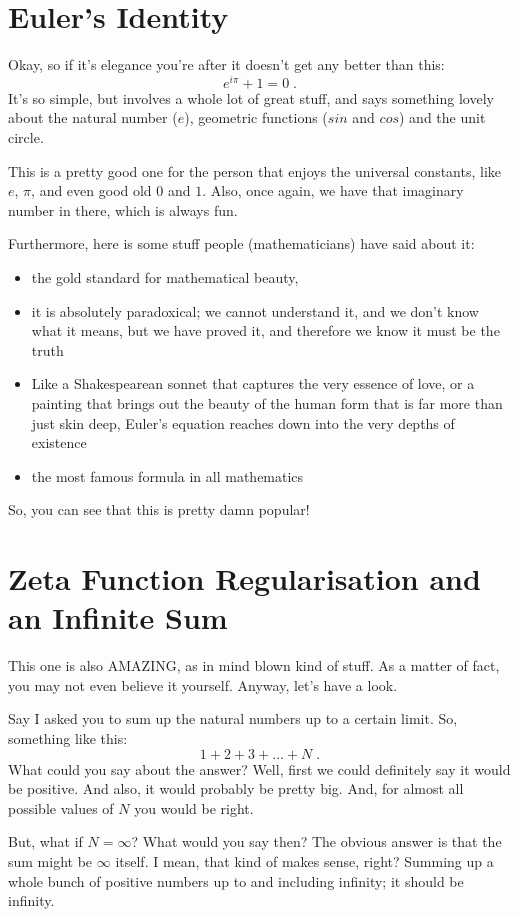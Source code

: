 \documentclass[12pt]{scrartcl}
\begin{document}
\section{Euler's Identity}

Okay, so if it's elegance you're after it doesn't get any better than this:
\[ e^{i\pi} + 1 = 0 \; . \]
It's so simple, but involves a whole lot of great stuff, and says something
lovely about the natural number ($e$), geometric functions ($sin$ and $cos$)
and the unit circle.

This is a pretty good one for the person that enjoys the universal constants,
like $e$, $\pi$, and even good old $0$ and $1$. Also, once again, we have that
imaginary number in there, which is always fun.

Furthermore, here is some stuff people (mathematicians) have said about it:
\begin{itemize}
  \item the gold standard for mathematical beauty,
  \item it is absolutely paradoxical; we cannot understand it, and we don't know what it means, but we have proved it, and therefore we know it must be the truth
  \item Like a Shakespearean sonnet that captures the very essence of love, or a painting that brings out the beauty of the human form that is far more than just skin deep, Euler's equation reaches down into the very depths of existence
  \item the most famous formula in all mathematics
\end{itemize}

So, you can see that this is pretty damn popular!

\section{Zeta Function Regularisation and an Infinite Sum}

This one is also AMAZING, as in mind blown kind of stuff. As a matter
of fact, you may not even believe it yourself. Anyway, let's have a look.

Say I asked you to sum up the natural numbers up to a certain limit. So,
something like this:
\[ 1 + 2 + 3 + ... + N \; . \]
What could you say about the answer? Well, first we could definitely say
it would be positive. And also, it would probably be pretty big. And, for
almost all possible values of $N$ you would be right.

But, what if $N = \infty$? What would you say then? The obvious answer is
that the sum might be $\infty$ itself. I mean, that kind of makes sense,
right? Summing up a whole bunch of positive numbers up to and including
infinity; it should be infinity.
\end{document}
